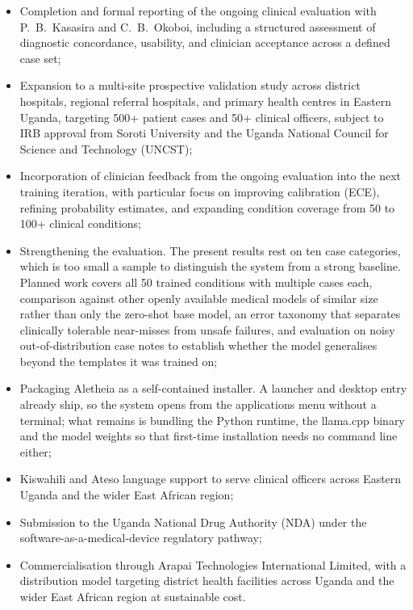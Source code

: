 \documentclass[journal]{IEEEtran}
\begin{document}
\begin{itemize}
  \item Completion and formal reporting of the ongoing clinical
        evaluation with P.~B.~Kasasira and C.~B.~Okoboi, including
        a structured assessment of diagnostic concordance, usability,
        and clinician acceptance across a defined case set;

  \item Expansion to a multi-site prospective validation study
        across district hospitals, regional referral hospitals, and
        primary health centres in Eastern Uganda, targeting 500+
        patient cases and 50+ clinical officers, subject to IRB
        approval from Soroti University and the Uganda National
        Council for Science and Technology (UNCST);

  \item Incorporation of clinician feedback from the ongoing
        evaluation into the next training iteration, with particular
        focus on improving calibration (ECE), refining probability
        estimates, and expanding condition coverage from 50 to
        100+ clinical conditions;

  \item Strengthening the evaluation. The present results rest on ten
        case categories, which is too small a sample to distinguish the
        system from a strong baseline. Planned work covers all 50
        trained conditions with multiple cases each, comparison against
        other openly available medical models of similar size rather
        than only the zero-shot base model, an error taxonomy that
        separates clinically tolerable near-misses from unsafe
        failures, and evaluation on noisy out-of-distribution case
        notes to establish whether the model generalises beyond the
        templates it was trained on;

  \item Packaging Aletheia as a self-contained installer. A launcher
        and desktop entry already ship, so the system opens from the
        applications menu without a terminal; what remains is bundling
        the Python runtime, the llama.cpp binary and the model weights
        so that first-time installation needs no command line either;

  \item Kiswahili and Ateso language support to serve clinical
        officers across Eastern Uganda and the wider East African
        region;

  \item Submission to the Uganda National Drug Authority (NDA)
        under the software-as-a-medical-device regulatory pathway;

  \item Commercialisation through Arapai Technologies International Limited, with a distribution model targeting district
        health facilities across Uganda and the wider East African
        region at sustainable cost.
\end{itemize}
\end{document}
